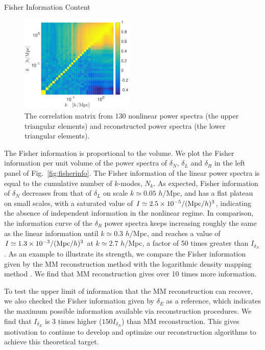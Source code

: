 \begin{section}{Fisher Information Content}
  \begin{figure}
    \centering
    \includegraphics[width=0.48\textwidth]{fig3.pdf}
    \caption{The correlation matrix from 130 nonlinear power
      spectra (the upper triangular elements) and reconstructed power
      spectra (the lower triangular elements).}
    \label{fig:corrall}
  \end{figure}

  The Fisher information is proportional to the volume. 
  We plot the Fisher information per unit volume of the power spectra of
  $\delta_N$, $\delta_L$ and $\delta_R$ in the left panel of 
  Fig.~\ref{fig:fisherinfo}. The Fisher information of the linear 
  power spectra is equal to the cumulative number of $k$-modes, $N_k$. As expected, Fisher information of
  $\delta_N$ decreases from that of $\delta_L$ on scale
  $k \simeq 0.05$ $h$/Mpc, and has a flat plateau on small scales, 
  with a saturated value of
  $I \simeq 2.5 \times 10^{-5}/({\rm Mpc}/h)^3$, indicating
  the absence of independent information in the nonlinear
  regime.  In comparison, the information curve of the $\delta_R$ power
  spectra keeps increasing roughly the same as the linear information
  until $k\simeq 0.3$ $h$/Mpc, and reaches a value of 
  $I \simeq 1.3 \times 10^{-3}/({\rm Mpc}/h)^3$ at $k \simeq 2.7$ $h$/Mpc,
  a factor of 50 times greater than $I_{\delta_N}$.
  As an example to illustrate its strength, we compare the Fisher information given by the MM reconstruction method
  with the logarithmic density mapping method \cite{bib:Mark2009}. We find that MM
  reconstruction gives over 10 times more information.
  
  To test the upper limit of information that the MM reconstruction can recover, 
  we also checked the Fisher information given by $\delta_E$ \cite{bib:Yu2016} as a reference, 
  which indicates the maximum possible information available via reconstruction procedures.
  We find that $I_{\delta_E}$ is 3 times higher ($150 I_{\delta_N}$) than MM reconstruction.
  This gives motivation to continue to develop and optimize our 
  reconstruction algorithms to achieve this theoretical target.
  

\end{section}

